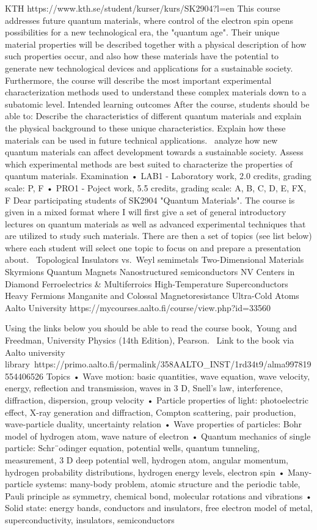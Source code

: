 \documentclass[%
oneside,                 %
final,                   %
10pt]{article}
\begin{document}
KTH 
https://www.kth.se/student/kurser/kurs/SK2904?l=en 
This course addresses future quantum materials, where control of the electron spin opens possibilities for a new technological era, the "quantum age". Their unique material properties will be described together with a physical description of how such properties occur, and also how these materials have the potential to generate new technological devices and applications for a sustainable society. Furthermore, the course will describe the most important experimental characterization methods used to understand these complex materials down to a subatomic level.
Intended learning outcomes
After the course, students should be able to:
Describe the characteristics of different quantum materials and explain the physical background to these unique characteristics.
Explain how these materials can be used in future technical applications. 
analyze how new quantum materials can affect development towards a sustainable society. 
Assess which experimental methods are best suited to characterize the properties of quantum materials.
Examination • LAB1 - Laboratory work, 2.0 credits, grading scale: P, F • PRO1 - Poject work, 5.5 credits, grading scale: A, B, C, D, E, FX, F
Dear participating students of SK2904 "Quantum Materials". The course is given in a mixed format where I will first give a set of general introductory lectures on quantum materials as well as advanced experimental techniques that are utilized to study such materials. There are then a set of topics (see list below) where each student will select one topic to focus on and prepare a presentation about. 
Topological Insulators vs.~Weyl semimetals
Two-Dimensional Materials
Skyrmions
Quantum Magnets
Nanostructured semiconductors
NV Centers in Diamond
Ferroelectrics {\&} Multiferroics
High-Temperature Superconductors
Heavy Fermions
Manganite and Colossal Magnetoresistance
Ultra-Cold Atoms
Aalto University 
https://mycourses.aalto.fi/course/view.php?id=33560 

Using the links below you should be able to read the course book, Young and Freedman, University Physics (14th Edition), Pearson. 
Link to the book via Aalto university library https://primo.aalto.fi/permalink/358AALTO_INST/1rd34t9/alma997819554406526
 Topics 
• Wave motion: basic quantities, wave equation, wave velocity, energy, reflection and transmission, waves in 3 D, Snell’s law, interference, diffraction, dispersion, group velocity 
• Particle properties of light: photoelectric effect, X-ray generation and diffraction, Compton scattering, pair production, wave-particle duality, uncertainty relation 
• Wave properties of particles: Bohr model of hydrogen atom, wave nature of electron 
• Quantum mechanics of single particle: Schr¨odinger equation, potential wells, quantum tunneling, measurement, 3 D deep potential well, hydrogen atom, angular momentum, hydrogen probability distributions, hydrogen energy levels, electron spin 
• Many-particle systems: many-body problem, atomic structure and the periodic table, Pauli principle as symmetry, chemical bond, molecular rotations and vibrations 
• Solid state: energy bands, conductors and insulators, free electron model of metal, superconductivity, insulators, semiconductors 
\end{document}

